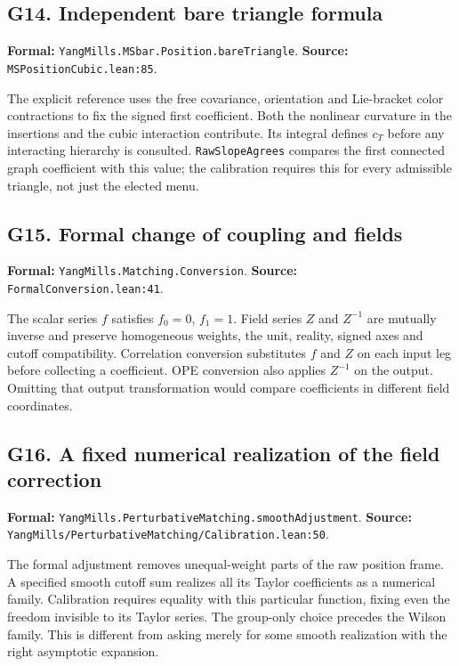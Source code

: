 \documentclass[11pt]{article}
\newcommand{\code}[1]{{\small\nolinkurl{#1}}}
\begin{document}
\subsection*{G14. Independent bare triangle formula}
\label{gloss:G14}
\textbf{Formal:} \code{YangMills.MSbar.Position.bareTriangle}.\newline
\textbf{Source:} \code{MSPositionCubic.lean:85}.

The explicit reference uses the free covariance, orientation and
Lie-bracket color contractions to fix the signed first coefficient.
Both the nonlinear curvature in the insertions and the cubic
interaction contribute. Its integral defines $c_T$ before any
interacting hierarchy is consulted. \code{RawSlopeAgrees} compares
the first connected graph coefficient with this value; the calibration
requires this for every admissible triangle, not just the elected menu.

\subsection*{G15. Formal change of coupling and fields}
\label{gloss:G15}
\textbf{Formal:} \code{YangMills.Matching.Conversion}.\newline
\textbf{Source:} \code{FormalConversion.lean:41}.

The scalar series $f$ satisfies $f_0=0$, $f_1=1$. Field series
$Z$ and $Z^{-1}$ are mutually inverse and preserve homogeneous
weights, the unit, reality, signed axes and cutoff compatibility.
Correlation conversion substitutes $f$ and $Z$ on each input leg
before collecting a coefficient. OPE conversion also applies
$Z^{-1}$ on the output. Omitting that output transformation would
compare coefficients in different field coordinates.

\subsection*{G16. A fixed numerical realization of the field correction}
\label{gloss:G16}
\textbf{Formal:} \code{YangMills.PerturbativeMatching.smoothAdjustment}.\newline
\textbf{Source:} \code{YangMills/PerturbativeMatching/Calibration.lean:50}.

The formal adjustment removes unequal-weight parts of the raw
position frame. A specified smooth cutoff sum realizes all its
Taylor coefficients as a numerical family. Calibration requires
equality with this particular function, fixing even the freedom
invisible to its Taylor series. The group-only choice precedes
the Wilson family. This is different from asking merely for some
smooth realization with the right asymptotic expansion.
\end{document}
